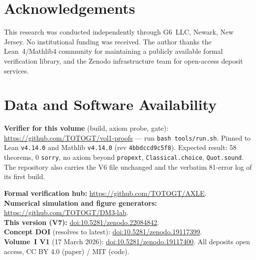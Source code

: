 \documentclass[14pt,a4paper]{extarticle}
\begin{document}
\section*{Acknowledgements}

This research was conducted independently through G6~LLC,
Newark, New Jersey.
No institutional funding was received.
The author thanks the Lean~4/Mathlib4 community for maintaining
a publicly available formal verification library, and the Zenodo
infrastructure team for open-access deposit services.

\section*{Data and Software Availability}

\begin{sloppypar}
\noindent
\textbf{Verifier for this volume} (build, axiom probe, gate):
\url{https://github.com/TOTOGT/vol1-proofs} --- run
\texttt{bash tools/run.sh}. Pinned to Lean \texttt{v4.14.0} and Mathlib
\texttt{v4.14.0} (rev \texttt{4bbdccd9c5f8}). Expected result: 58
theorems, 0 \texttt{sorry}, no axiom beyond \texttt{propext},
\texttt{Classical.choice}, \texttt{Quot.sound}. The repository also carries
the V6 file unchanged and the verbatim 81-error log of its first build.

\medskip
\noindent
\textbf{Formal verification hub:} \url{https://github.com/TOTOGT/AXLE}.\\
\textbf{Numerical simulation and figure generators:}
\url{https://github.com/TOTOGT/DM3-lab}.\\
\textbf{This version (V7):}
\href{https://doi.org/10.5281/zenodo.22084842}{doi:10.5281/zenodo.22084842}.\\
\textbf{Concept DOI} (resolves to latest):
\href{https://doi.org/10.5281/zenodo.19117399}{doi:10.5281/zenodo.19117399}.\\
\textbf{Volume~I V1} (17 March 2026):
\href{https://doi.org/10.5281/zenodo.19117400}{doi:10.5281/zenodo.19117400}.
All deposits open access, CC BY 4.0 (paper) / MIT (code).
\end{sloppypar}
\end{document}
